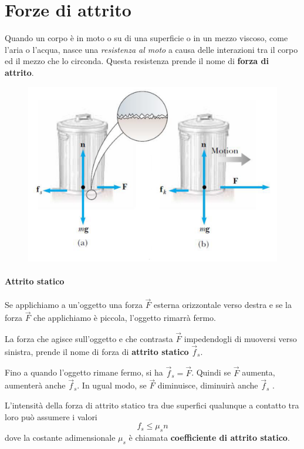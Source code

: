 \documentclass[12pt,oneside]{book}
\begin{document}
\section{Forze di attrito}
Quando un corpo è in moto o su di una superficie o in un mezzo viscoso, come l’aria o l’acqua, 
nasce una \emph{resistenza al moto} a causa delle interazioni tra il corpo ed il mezzo che lo circonda. Questa resistenza prende il nome di \textbf{forza di attrito}.
\begin{figure}[h]
    \centering
    \includegraphics[scale=0.23]{attrito_bidone}
\end{figure}

\paragraph{Attrito statico}
Se applichiamo a un'oggetto una forza $\vec{F}$ esterna orizzontale verso destra e se la forza $\vec{F}$ che applichiamo è piccola, l'oggetto rimarrà fermo.

La forza che agisce sull'oggetto e che contrasta $\vec{F}$ impedendogli di muoversi verso sinistra, prende il nome di forza di \textbf{attrito statico} $\vec{f}_s$.

Fino a quando l'oggetto rimane fermo, si ha $\vec{f}_s = \vec{F}$. Quindi se $\vec{F}$ aumenta, aumenterà anche $\vec{f}_s$. In ugual modo, se $\vec{F}$ diminuisce, diminuirà anche $\vec{f}_s$ .

L’intensità della forza di attrito statico tra due superfici qualunque a contatto tra loro può assumere i valori
\begin{equation*}
    f_s \le \mu_s n
\end{equation*}
dove la costante adimensionale $\mu_s$ è chiamata \textbf{coefficiente di attrito statico}.
\end{document}

